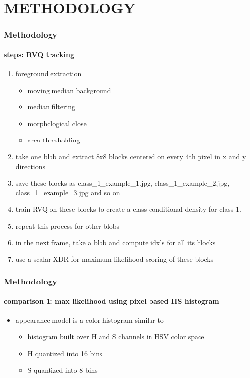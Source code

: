 \section{METHODOLOGY}
\begin{frame}
\frametitle{Methodology}
\framesubtitle{steps: RVQ tracking}
\mypagenum
	\begin{enumerate}
		\item foreground extraction
			\begin{itemize}
				\item moving median background
		 		\item median filtering
				\item morphological close
				\item area thresholding
			\end{itemize}
		\item take one blob and extract 8x8 blocks centered on every 4th pixel in x and y directions
		\item save these blocks as class\_1\_example\_1.jpg, class\_1\_example\_2.jpg, class\_1\_example\_3.jpg and so on 
		\item train RVQ on these blocks to create a class conditional density for class 1.
		\item repeat this process for other blobs
		\item in the next frame, take a blob and compute idx's for all its blocks
		\item use a scalar XDR for maximum likelihood scoring of these blocks
	\end{enumerate}
\end{frame}



\begin{frame}
\frametitle{Methodology}
\framesubtitle{comparison 1: max likelihood using pixel based HS histogram}
\mypagenum
	\begin{itemize}
		\item appearance model is a color histogram similar to 
		\begin{itemize}
			\item histogram built over H and S channels in HSV color space
			\item H quantized into 16 bins
			\item S quantized into 8 bins
		\end{itemize}
	\end{itemize}
\end{frame}




